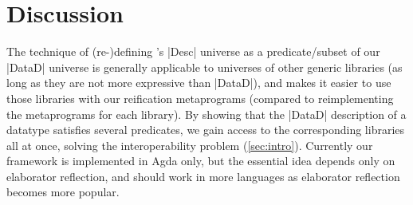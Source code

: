 \documentclass[sigplan,review,fleqn]{acmart}
\renewcommand{\verb}{\collectverb{\color{AgdaFunction}}}
\begin{document}


\section{Discussion}
\label{sec:discussion}

The technique of (re-)defining \citeauthor{Allais-generic-syntax}'s \verb|Desc| universe as a predicate/subset of our \verb|DataD| universe is generally applicable to universes of other generic libraries (as long as they are not more expressive than \verb|DataD|), and makes it easier to use those libraries with our reification metaprograms (compared to reimplementing the metaprograms for each library).
By showing that the \verb|DataD| description of a datatype satisfies several predicates, we gain access to the corresponding libraries all at once, solving the interoperability problem (\cref{sec:intro}).
Currently our framework is implemented in Agda only, but the essential idea depends only on elaborator reflection, and should work in more languages as elaborator reflection becomes more popular.


\end{document}
